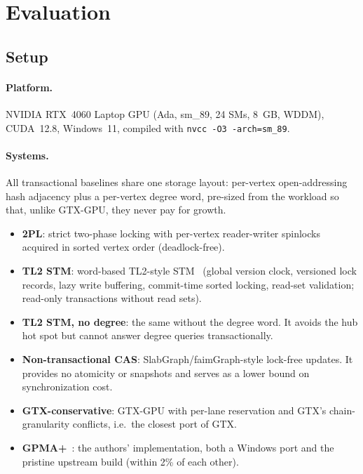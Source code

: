 \documentclass[sigconf,nonacm]{acmart}
\newcommand{\sys}{GTX-GPU}
\newcommand{\code}[1]{\texttt{#1}}
\begin{document}
\section{Evaluation}
\label{sec:eval}

\subsection{Setup}
\label{sec:setup}
\paragraph{Platform.} NVIDIA RTX~4060 Laptop GPU (Ada, sm\_89, 24 SMs, 8~GB, WDDM), CUDA~12.8, Windows~11, compiled
with \code{nvcc -O3 -arch=sm\_89}.

\paragraph{Systems.} All transactional baselines share one storage layout: per-vertex open-addressing hash adjacency
plus a per-vertex degree word, pre-sized from the workload so that, unlike \sys{}, they never pay for growth.
\begin{itemize}
\item \textbf{2PL}: strict two-phase locking with per-vertex reader-writer spinlocks acquired in sorted vertex order
(deadlock-free).
\item \textbf{TL2 STM}: word-based TL2-style STM~\cite{tl2} (global version clock, versioned lock records, lazy write
buffering, commit-time sorted locking, read-set validation; read-only transactions without read sets).
\item \textbf{TL2 STM, no degree}: the same without the degree word. It avoids the hub hot spot but cannot answer
degree queries transactionally.
\item \textbf{Non-transactional CAS}: SlabGraph/faimGraph-style lock-free updates. It provides no atomicity or
snapshots and serves as a lower bound on synchronization cost.
\item \textbf{GTX-conservative}: \sys{} with per-lane reservation and GTX's chain-granularity conflicts, i.e.\ the
closest port of GTX.
\item \textbf{GPMA+}~\cite{gpma}: the authors' implementation, both a Windows port and the pristine upstream build
(within 2\% of each other).
\end{itemize}
\end{document}
